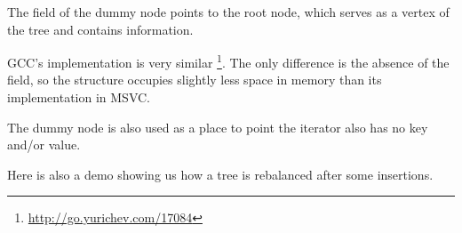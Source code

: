 The  field of the dummy node points to the root node, which serves
as a vertex of the tree and contains information.






GCC's implementation is very similar
\footnote{\url{http://go.yurichev.com/17084}}.
The only difference is the absence of the  field,
so the structure occupies slightly less space in memory than its implementation in MSVC.

The dummy node is also used as a place to point the  iterator also has no key and/or value.


Here is also a demo showing us how a tree is rebalanced after some insertions.





